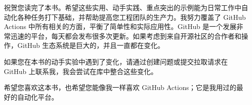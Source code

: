 
祝贺您读完了本书。希望这些实用、动手实践、重点突出的示例能为日常工作中自动化各种任务打下基础，并帮助提高您工程团队的生产力。我努力覆盖了 GitHub Actions 中所有相关的方面，平衡了简单性和实际应用性。GitHub 是一个发展非常迅速的平台，每天都会发布很多次更新。如果考虑到来自开源社区的合作者和操作，GitHub 生态系统是巨大的，并且一直都在变化。

如果您在本书的动手实验中遇到了变化，请通过创建问题或提交拉取请求在 GitHub 上联系我，我会尝试在库中整合这些变化。

希望您喜欢这本书，也希望您能像我一样喜欢 GitHub Actions；它是我用过的最好的自动化平台。











